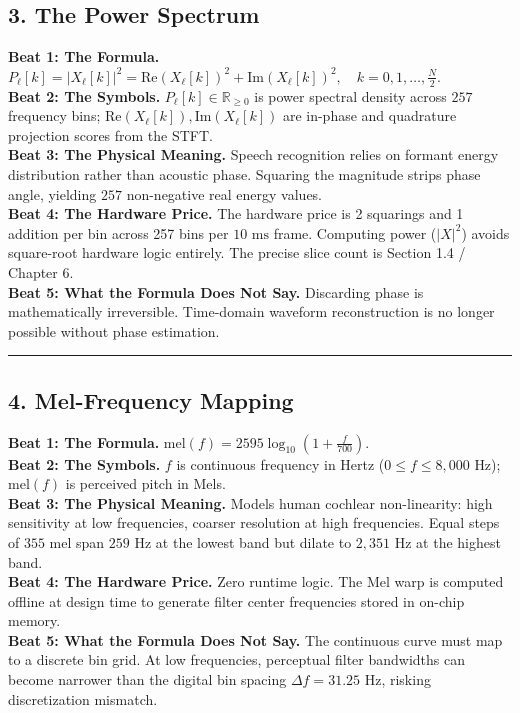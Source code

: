 \documentclass[11pt,a4paper]{article}
\begin{document}
\subsection*{3. The Power Spectrum}
\vspace{-2.5mm}
{\small
\textbf{Beat 1: The Formula.} $P_\ell[k] = |X_\ell[k]|^2 = \text{Re}(X_\ell[k])^2 + \text{Im}(X_\ell[k])^2, \quad k = 0, 1, \dots, \frac{N}{2}$.\\[0.8mm]
\textbf{Beat 2: The Symbols.} $P_\ell[k] \in \mathbb{R}_{\ge 0}$ is power spectral density across $257$ frequency bins; $\text{Re}(X_\ell[k]), \text{Im}(X_\ell[k])$ are in-phase and quadrature projection scores from the STFT.\\[0.8mm]
\textbf{Beat 3: The Physical Meaning.} Speech recognition relies on formant energy distribution rather than acoustic phase. Squaring the magnitude strips phase angle, yielding $257$ non-negative real energy values.\\[0.8mm]
\textbf{Beat 4: The Hardware Price.} The hardware price is 2 squarings and 1 addition per bin across 257 bins per $10\text{ ms}$ frame. Computing power ($|X|^2$) avoids square-root hardware logic entirely. The precise slice count is Section 1.4 / Chapter 6.\\[0.8mm]
\textbf{Beat 5: What the Formula Does Not Say.} Discarding phase is mathematically irreversible. Time-domain waveform reconstruction is no longer possible without phase estimation.
}

\vspace{1.5mm}
\hrule
\vspace{1.5mm}

\subsection*{4. Mel-Frequency Mapping}
\vspace{-2.5mm}
{\small
\textbf{Beat 1: The Formula.} $\mathrm{mel}(f) = 2595 \log_{10}\!\left(1 + \frac{f}{700}\right)$.\\[0.8mm]
\textbf{Beat 2: The Symbols.} $f$ is continuous frequency in Hertz ($0 \le f \le 8{,}000\text{ Hz}$); $\mathrm{mel}(f)$ is perceived pitch in Mels.\\[0.8mm]
\textbf{Beat 3: The Physical Meaning.} Models human cochlear non-linearity: high sensitivity at low frequencies, coarser resolution at high frequencies. Equal steps of $355\text{ mel}$ span $259\text{ Hz}$ at the lowest band but dilate to $2{,}351\text{ Hz}$ at the highest band.\\[0.8mm]
\textbf{Beat 4: The Hardware Price.} Zero runtime logic. The Mel warp is computed offline at design time to generate filter center frequencies stored in on-chip memory.\\[0.8mm]
\textbf{Beat 5: What the Formula Does Not Say.} The continuous curve must map to a discrete bin grid. At low frequencies, perceptual filter bandwidths can become narrower than the digital bin spacing $\Delta f = 31.25\text{ Hz}$, risking discretization mismatch.
}
\end{document}
